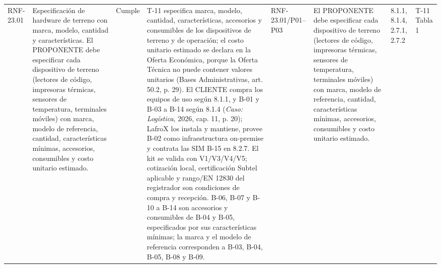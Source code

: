 \documentclass[oficio,firma,final]{lafrox}
\begin{document}
\begin{landscape}
{\begin{longtable}{@{}F{0.054} F{0.173} F{0.061} F{0.191} F{0.106} F{0.180} F{0.067} F{0.168}@{}}
  RNF-23.01 & Especificación de hardware de terreno con marca, modelo, cantidad y características. El PROPONENTE debe especificar cada dispositivo de terreno (lectores de código, impresoras térmicas, sensores de temperatura, terminales móviles) con marca, modelo de referencia, cantidad, características mínimas, accesorios, consumibles y costo unitario estimado. & Cumple & T-11 especifica marca, modelo, cantidad, características, accesorios y consumibles de los dispositivos de terreno y de operación; el costo unitario estimado se declara en la Oferta Económica, porque la Oferta Técnica no puede contener valores unitarios (Bases Administrativas, art. 50.2, p. 29). El CLIENTE compra los equipos de uso según 8.1.1, y B-01 y B-03 a B-14 según 8.1.4 (\textit{Caso: Logística}, 2026, cap. 11, p. 20); LafroX los instala y mantiene, provee B-02 como infraestructura on-premise y contrata las SIM B-15 en 8.2.7. El kit se valida con V1/V3/V4/V5; cotización local, certificación Subtel aplicable y rango/EN 12830 del registrador son condiciones de compra y recepción. B-06, B-07 y B-10 a B-14 son accesorios y consumibles de B-04 y B-05, especificados por sus características mínimas; la marca y el modelo de referencia corresponden a B-03, B-04, B-05, B-08 y B-09. & RNF-23.01/\allowbreak{}P01--\allowbreak{}P03 & El PROPONENTE debe especificar cada dispositivo de terreno (lectores de código, impresoras térmicas, sensores de temperatura, terminales móviles) con marca, modelo de referencia, cantidad, características mínimas, accesorios, consumibles y costo unitario estimado. & 8.1.1, 8.1.4, 2.7.1, 2.7.2 & T-11 Tabla 1  \\

\end{longtable}}
\end{landscape}
\end{document}

